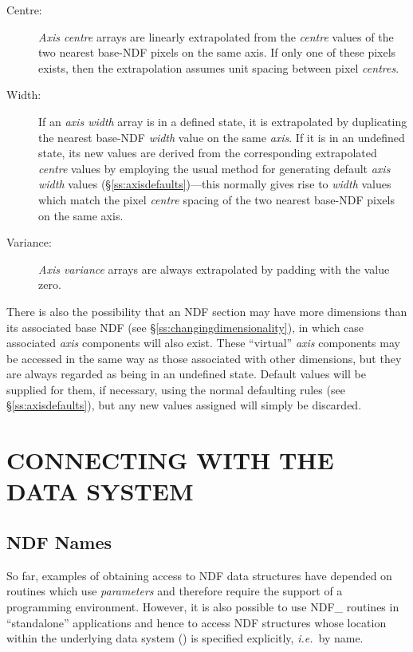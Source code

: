 \documentclass[twoside,11pt,nolof]{starlink}
\providecommand{\st}[1]{{\emph{#1}}}
\begin{document}
\begin{description}

\item[Centre:] \st{Axis centre\/} arrays are linearly extrapolated from the
\st{centre\/} values of the two nearest base-NDF pixels on the same axis.
If only one of these pixels exists, then the extrapolation assumes unit
spacing between pixel \st{centres}.

\item[Width:] If an \st{axis width\/} array is in a defined state, it is
extrapolated by duplicating the nearest base-NDF \st{width} value on the
same \st{axis}.
If it is in an undefined state, its new values are derived from the
corresponding extrapolated \st{centre\/} values by employing the usual
method for generating default \st{axis width\/} values
(\S\ref{ss:axisdefaults})---this normally gives rise to \st{width\/}
values which match the pixel \st{centre\/} spacing of the two nearest
base-NDF  pixels on the same axis.

\item[Variance:] \st{Axis variance\/} arrays are always extrapolated by
padding with the value zero.

\end{description}

There is also the possibility that an NDF section may have more dimensions
than its associated base NDF (see \S\ref{ss:changingdimensionality}), in
which case associated \st{axis\/} components will also exist.
These ``virtual'' \st{axis\/} components may be accessed in the same way as
those associated with other dimensions, but they are always regarded as
being in an undefined state.
Default values will be supplied for them, if necessary, using the normal
defaulting rules (see \S\ref{ss:axisdefaults}), but any new values assigned
will simply be discarded.


\section{\label{ss:connecting}CONNECTING WITH THE DATA SYSTEM}

\subsection{\label{ss:ndfnames}NDF Names}

So far, examples of obtaining access to NDF data structures have
depended on routines which use \st{parameters} and therefore require
the support of a programming environment.
However, it is also possible to use NDF\_ routines in ``standalone''
applications and hence to access NDF structures whose location within
the underlying data system () is specified
explicitly, \st{i.e.}\ by name.
\end{document}

